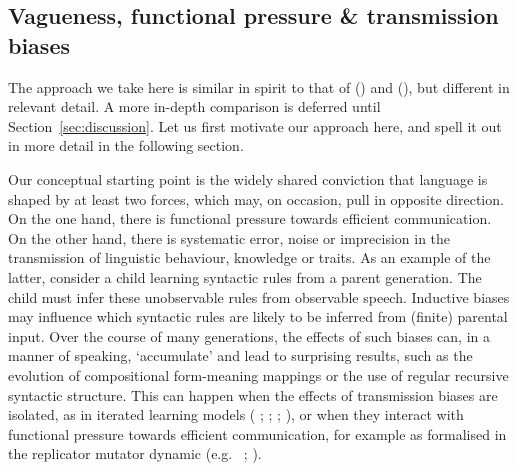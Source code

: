 \documentclass[11pt,english]{article}
\numberwithin{equation}{section}
\newcommand{\citetbjps}[1]{\citeauthor{#1} (\citeyear{#1})}
\newcommand{\citealtbjps}[1]{\citeauthor{#1} \citeyear{#1}}
\begin{document}
\subsection{Vagueness, functional pressure \& transmission biases}
\label{sec:vagu-funct-press}

The approach we take here is similar in spirit to that of
\citetbjps{FrankeJager2010:Vagueness-Signa} and \citetbjps{OConnor2013:The-Evolution-o}, but different
in relevant detail. A more in-depth comparison is deferred until
Section~\ref{sec:discussion}. Let us first motivate our approach here, and spell it out in more
detail in the following section.

Our conceptual starting point is the widely shared conviction that language is shaped by at
least two forces, which may, on occasion, pull in opposite direction. On the one hand, there is
functional pressure towards efficient communication. On the other hand, there is systematic
error, noise or imprecision in the transmission of linguistic behaviour, knowledge or traits. As
an example of the latter, consider a child learning syntactic rules from a parent
generation. The child must infer these unobservable rules from observable speech. Inductive
biases may influence which syntactic rules are likely to be inferred from (finite) parental
input. Over the course of many generations, the effects of such biases can, in a manner of
speaking, `accumulate' and lead to surprising results, such as the evolution of compositional
form-meaning mappings or the use of regular recursive syntactic structure. This can happen when
the effects of transmission biases are isolated, as in iterated learning models
(\citealtbjps{KirbyHurford2002:The-Emergence-o}; \citealtbjps{SmithKirby2003:Iterated-Learni}; \citealtbjps{GriffithsKalish2007:Language-Evolut}; \citealtbjps{KirbyGriffith2014:Iterated-Learni}),
or when they interact with functional pressure towards efficient communication, for example as
formalised in the replicator mutator dynamic
(e.g.~\citealtbjps{NowakPlotkin2000:The-Evolution-o}; \citealtbjps{NowakKomarova2001:Evolution-of-Un}).
\end{document}
